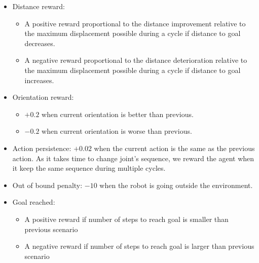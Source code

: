         \begin{itemize}
            \item Distance reward:
            \begin{itemize}
                \item A positive reward proportional to the distance improvement relative to the maximum displacement possible during a cycle if distance to goal decreases.
                \item A negative reward proportional to the distance deterioration relative to the maximum displacement possible during a cycle if distance to goal increases.
            \end{itemize}
            \item Orientation reward:
            \begin{itemize}
                \item $+0.2$ when current orientation is better than previous.
                \item $-0.2$ when current orientation is worse than previous.
            \end{itemize}
            \item Action persistence: $+0.02$ when the current action is the same as the previous action. As it takes time to change joint's sequence, we reward the agent when it keep the same sequence during multiple cycles.
            \item Out of bound penalty: $-10$ when the robot is going outside the environment.
            \item Goal reached:
                \begin{itemize}
                    \item A positive reward if number of steps to reach goal is smaller than previous scenario
                    \item A negative reward if number of steps to reach goal is larger than previous scenario
                \end{itemize}
        \end{itemize}
        
            
            